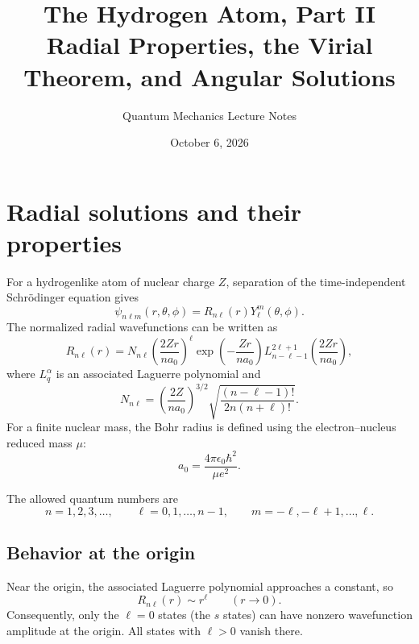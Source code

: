 \documentclass[11pt]{article}
\title{The Hydrogen Atom, Part II\\[0.4em]
\large Radial Properties, the Virial Theorem, and Angular Solutions}
\author{Quantum Mechanics Lecture Notes}
\date{October 6, 2026}
\begin{document}
\maketitle
\tableofcontents

\section{Radial solutions and their properties}

For a hydrogenlike atom of nuclear charge $Z$, separation of the time-independent
Schr\"odinger equation gives
\begin{equation}
  \psi_{n\ell m}(r,\theta,\phi)
  =R_{n\ell}(r)Y_{\ell}^{m}(\theta,\phi).
\end{equation}
The normalized radial wavefunctions can be written as
\begin{equation}
  R_{n\ell}(r)
  =N_{n\ell}
  \left(\frac{2Zr}{na_0}\right)^{\ell}
  \exp\left(-\frac{Zr}{na_0}\right)
  L_{n-\ell-1}^{2\ell+1}\left(\frac{2Zr}{na_0}\right),
  \label{eq:radial-solution}
\end{equation}
where $L_q^{\alpha}$ is an associated Laguerre polynomial and
\begin{equation}
  N_{n\ell}
  =\left(\frac{2Z}{na_0}\right)^{3/2}
  \sqrt{\frac{(n-\ell-1)!}{2n(n+\ell)!}}.
\end{equation}
For a finite nuclear mass, the Bohr radius is defined using the electron--nucleus
reduced mass $\mu$:
\begin{equation}
  a_0=\frac{4\pi\epsilon_0\hbar^2}{\mu e^2}.
\end{equation}

The allowed quantum numbers are
\begin{equation}
  n=1,2,3,\ldots,
  \qquad
  \ell=0,1,\ldots,n-1,
  \qquad
  m=-\ell,-\ell+1,\ldots,\ell.
\end{equation}

\subsection{Behavior at the origin}

Near the origin, the associated Laguerre polynomial approaches a constant, so
\begin{equation}
  R_{n\ell}(r)\sim r^{\ell}
  \qquad (r\to 0).
\end{equation}
Consequently, only the $\ell=0$ states (the $s$ states) can have nonzero
wavefunction amplitude at the origin.  All states with $\ell>0$ vanish there.
\end{document}
